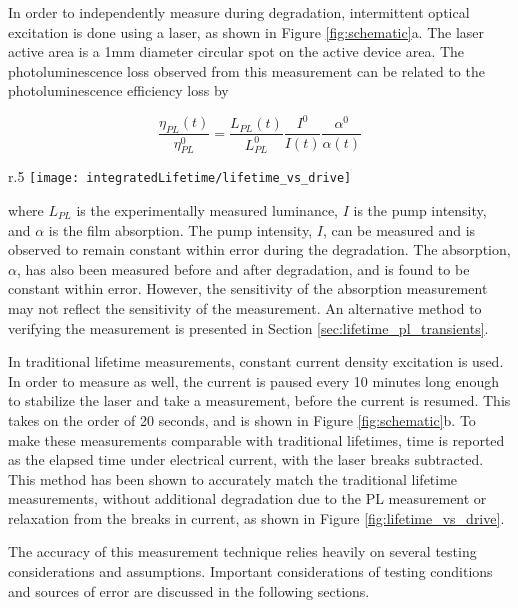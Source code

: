 \documentclass[../thesis.tex]{subfiles}
\begin{document}
In order to independently measure \pl during degradation, intermittent optical excitation is done using a laser, as shown in Figure \ref{fig:schematic}a.
The laser active area is a 1mm diameter circular spot on the active device area.
The photoluminescence loss observed from this measurement can be related to the photoluminescence efficiency loss by

\begin{equation}
\frac{\eta_{PL}(t)}{\eta_{PL}^0}=\frac{L_{PL}(t)}{L_{PL}^0}\frac{I^0}{I(t)}\frac{\alpha^0}{\alpha(t)}
\label{eqn:pl_decay}
\end{equation}

\begin{wrapfigure}{r}{.5\textwidth}
\centering
\texttt{[image: integratedLifetime/lifetime\_vs\_drive]}
\caption{Lifetime obtained under a constant driving current is shown in red solid line.  Lifetime under the same conditions but with PL measurement breaks is shown in open squares.  Strong agreement is observed.}
\label{fig:lifetime_vs_drive}
\end{wrapfigure}

where $L_{PL}$ is the experimentally measured luminance, $I$ is the pump intensity, and $\alpha$ is the film absorption.
The pump intensity, $I$, can be measured and is observed to remain constant within error during the degradation.
The absorption, $\alpha$, has also been measured before and after degradation, and is found to be constant within error.
However, the sensitivity of the absorption measurement may not reflect the sensitivity of the \pl measurement.
An alternative method to verifying the \pl measurement is presented in Section \ref{sec:lifetime_pl_transients}.


In traditional lifetime measurements, constant current density excitation is used.  
In order to measure \pl as well, the current is paused every 10 minutes long enough to stabilize the laser and take a measurement, before the current is resumed.
This takes on the order of 20 seconds, and is shown in Figure \ref{fig:schematic}b.
To make these measurements comparable with traditional lifetimes, time is reported as the elapsed time under electrical current, with the laser breaks subtracted.
This method has been shown to accurately match the traditional lifetime measurements, without additional degradation due to the PL measurement or relaxation from the breaks in current, as shown in Figure \ref{fig:lifetime_vs_drive}.

The accuracy of this measurement technique relies heavily on several testing considerations and assumptions.
Important considerations of testing conditions and sources of error are discussed in the following sections.
\end{document}
